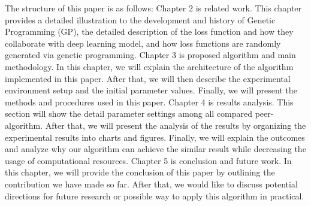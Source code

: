 \begin{ZhChapter}
The structure of this paper is as follows: Chapter 2 is related work. This chapter provides a detailed illustration to the development and history of Genetic Programming (GP), the detailed description of the loss function and how they collaborate with deep learning model, and how loss functions are randomly generated via genetic programming. Chapter 3 is proposed algorithm and main methodology. In this chapter, we will explain the architecture of the algorithm implemented in this paper. After that, we will then describe the experimental environment setup and the initial parameter values. Finally, we will present the methods and procedures used in this paper. Chapter 4 is results analysis. This section will show the detail parameter settings among all compared peer-algorithm. After that, we will present the analysis of the results by organizing the experimental results into charts and figures. Finally, we will explain the outcomes and analyze why our algorithm can achieve the similar result while decreasing the usage of computational resources. Chapter 5 is conclusion and future work. In this chapter, we will provide the conclusion of this paper by outlining the contribution we have made so far. After that, we would like to discuss potential directions for future research or possible way to apply this algorithm in practical.





\end{ZhChapter}
